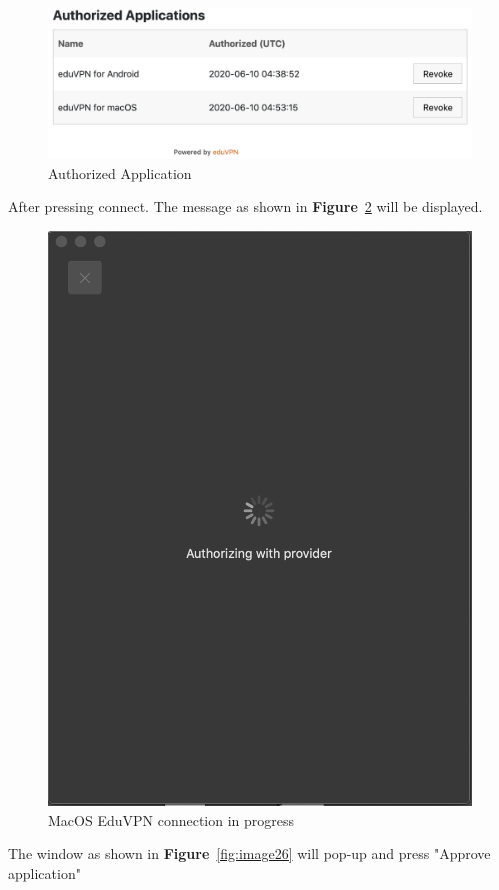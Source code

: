 \begin{figure}[!thb]
	\centering
	\includegraphics[scale=0.3]{Chapters/images/revoke2.png}
	
	\caption{Authorized Application }
	\label{fig:revoke}
\end{figure}






After pressing connect. The message as shown in \textbf{Figure}~\ref{fig:image7} will be displayed.
\begin{figure}[H]
	\centering
	\includegraphics[scale=0.4]{Chapters/images/image7.png}
	
	\caption{MacOS EduVPN connection in progress }
	\label{fig:image7}
\end{figure}
 The window as shown in \textbf{Figure}~\ref{fig:image26}  will pop-up and press "Approve application"


